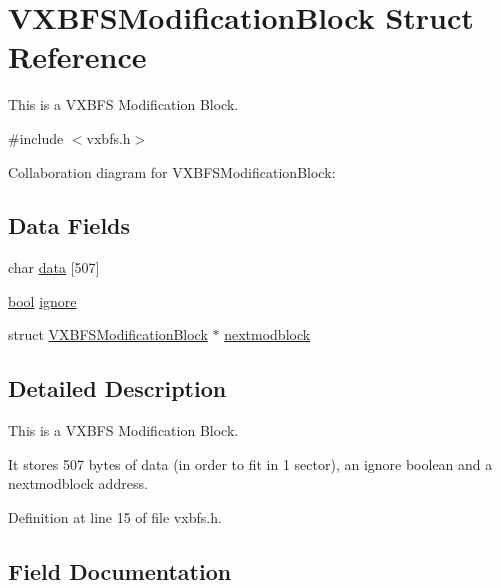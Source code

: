 \hypertarget{a00322}{}\section{V\+X\+B\+F\+S\+Modification\+Block Struct Reference}
\label{a00322}


This is a V\+X\+B\+FS Modification Block.  




{\ttfamily \#include $<$vxbfs.\+h$>$}



Collaboration diagram for V\+X\+B\+F\+S\+Modification\+Block\+:
\subsection*{Data Fields}
\begin{DoxyCompactItemize}
\item 
char \hyperlink{a00322_a327348a3ea3a02cfde4cdb1ccdcf2073_a327348a3ea3a02cfde4cdb1ccdcf2073}{data} \mbox{[}507\mbox{]}
\item 
\hyperlink{a00140_af6a258d8f3ee5206d682d799316314b1_af6a258d8f3ee5206d682d799316314b1}{bool} \hyperlink{a00322_a0f4e6adc96a9bee9135ce10b344679fb_a0f4e6adc96a9bee9135ce10b344679fb}{ignore}
\item 
struct \hyperlink{a00322}{V\+X\+B\+F\+S\+Modification\+Block} $\ast$ \hyperlink{a00322_afbf261c73a36b4d33e8a8b5179d4385b_afbf261c73a36b4d33e8a8b5179d4385b}{nextmodblock}
\end{DoxyCompactItemize}


\subsection{Detailed Description}
This is a V\+X\+B\+FS Modification Block. 

It stores 507 bytes of data (in order to fit in 1 sector), an ignore boolean and a nextmodblock address. 

Definition at line 15 of file vxbfs.\+h.



\subsection{Field Documentation}
\mbox{\label{a00322_a327348a3ea3a02cfde4cdb1ccdcf2073_a327348a3ea3a02cfde4cdb1ccdcf2073}} 
